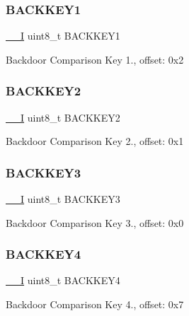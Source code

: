 \subsubsection{\texorpdfstring{BACKKEY1}{BACKKEY1}}
{\footnotesize\ttfamily \mbox{\hyperlink{core__cm0plus_8h_af63697ed9952cc71e1225efe205f6cd3}{\+\_\+\+\_\+I}} uint8\+\_\+t B\+A\+C\+K\+K\+E\+Y1}

Backdoor Comparison Key 1., offset\+: 0x2 \mbox{\label{struct_n_v___type_ae0ad5dd66c2109955a90e1a6f4720a43}} 
\subsubsection{\texorpdfstring{BACKKEY2}{BACKKEY2}}
{\footnotesize\ttfamily \mbox{\hyperlink{core__cm0plus_8h_af63697ed9952cc71e1225efe205f6cd3}{\+\_\+\+\_\+I}} uint8\+\_\+t B\+A\+C\+K\+K\+E\+Y2}

Backdoor Comparison Key 2., offset\+: 0x1 \mbox{\label{struct_n_v___type_a7d27c275caa809e8b950cb9fb1f52ea5}} 
\subsubsection{\texorpdfstring{BACKKEY3}{BACKKEY3}}
{\footnotesize\ttfamily \mbox{\hyperlink{core__cm0plus_8h_af63697ed9952cc71e1225efe205f6cd3}{\+\_\+\+\_\+I}} uint8\+\_\+t B\+A\+C\+K\+K\+E\+Y3}

Backdoor Comparison Key 3., offset\+: 0x0 \mbox{\label{struct_n_v___type_a925e5cd64e47102087d0a66af786a626}} 
\subsubsection{\texorpdfstring{BACKKEY4}{BACKKEY4}}
{\footnotesize\ttfamily \mbox{\hyperlink{core__cm0plus_8h_af63697ed9952cc71e1225efe205f6cd3}{\+\_\+\+\_\+I}} uint8\+\_\+t B\+A\+C\+K\+K\+E\+Y4}

Backdoor Comparison Key 4., offset\+: 0x7 \mbox{\label{struct_n_v___type_aa4ca5b627931a03b02c1d4ac01e664d5}} 
